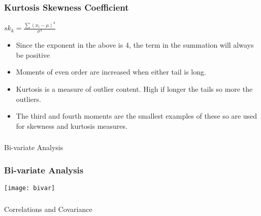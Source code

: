 \begin{frame}[fragile]\frametitle{Kurtosis Skewness Coefficient}	
$sk_k = \frac{\sum (x_i - \mu)^4}{\sigma^4}$

\begin{itemize}
\item Since the exponent in the above is 4, the term in the summation will always be positive 
\item Moments of even order are increased when either tail is long. 
\item Kurtosis is a measure of outlier content. High if longer the tails so more the outliers.
\item The third and fourth moments are the smallest examples of these so are used for skewness and kurtosis measures.
\end{itemize}
\end{frame}

\begin{frame}[fragile]\frametitle{}
\begin{center}
{\Large Bi-variate Analysis}
\end{center}
\end{frame}

\begin{frame}[fragile]\frametitle{Bi-variate Analysis}	
\begin{center}
\texttt{[image: bivar]}
\end{center}
\end{frame}

\begin{frame}[fragile]\frametitle{}

\begin{center}
{\large Correlations and Covariance}
\end{center}
\end{frame}


